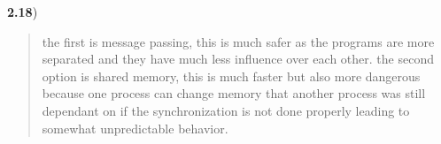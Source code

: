 \documentclass[11pt]{article}
\newenvironment{subquestion}[1]{\textbf{#1}) \begin{quote}}{\end{quote}}
\begin{document}
  \begin{subquestion}{2.18}
    the first is message passing, this is much safer as the programs are more separated and they
    have much less influence over each other. the second option is shared memory, this is
    much faster but also more dangerous because one process can change memory that another
    process was still dependant on if the synchronization is not done properly leading to
    somewhat unpredictable behavior.
  \end{subquestion}
\end{document}
